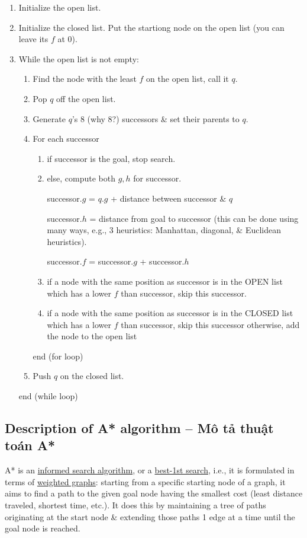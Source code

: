 \documentclass{article}
\begin{document}
\begin{enumerate}
    \item Initialize the open list.
    \item Initialize the closed list. Put the startiong node on the open list (you can leave its $f$ at 0).
    \item While the open list is not empty:
    \begin{enumerate}
        \item Find the node with the least $f$ on the open list, call it $q$.
        \item Pop $q$ off the open list.
        \item Generate $q$'s 8 (why 8?) successors \& set their parents to $q$.
        \item For each successor
        \begin{enumerate}
            \item if successor is the goal, stop search.
            \item else, compute both $g,h$ for successor.
            
            successor.$g$ = $q$.$g$ + distance between successor \& $q$
            
            successor.$h$ = distance from goal to successor (this can be done using many ways, e.g., 3 heuristics: Manhattan, diagonal, \& Euclidean heuristics).
            
            successor.$f$ = successor.$g$ + successor.$h$
            \item if a node with the same position as successor is in the OPEN list which has a lower $f$ than successor, skip this successor.
            \item if a node with the same position as successor is in the CLOSED list which has a lower $f$ than successor, skip this successor otherwise, add the node to the open list
        \end{enumerate}
        end (for loop)
        \item Push $q$ on the closed list.
    \end{enumerate}
    end (while loop)
\end{enumerate}


\subsection{Description of A* algorithm -- Mô tả thuật toán A*}
A* is an \href{https://en.wikipedia.org/wiki/Informed_search_algorithm}{informed search algorithm}, or a \href{https://en.wikipedia.org/wiki/Best-first_search}{best-1st search}, i.e., it is formulated in terms of \href{https://en.wikipedia.org/wiki/Weighted_graph}{weighted graphs}: starting from a specific starting node of a graph, it aims to find a path to the given goal node having the smallest cost (least distance traveled, shortest time, etc.). It does this by maintaining a tree of paths originating at the start node \& extending those paths 1 edge at a time until the goal node is reached.
\end{document}
